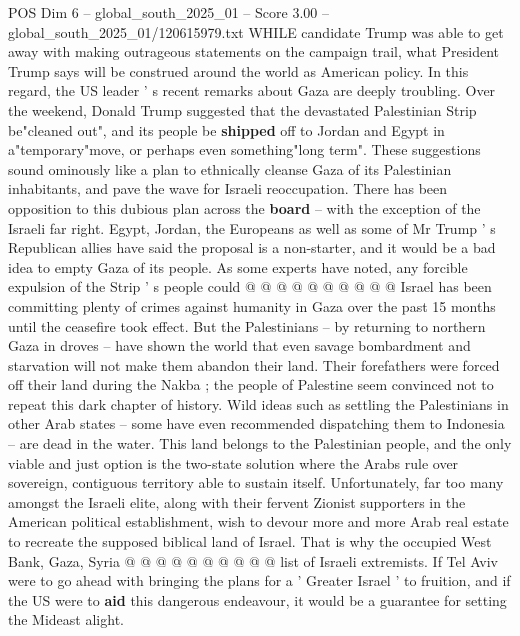 \begin{textsample}{POS Dim 6 – global\_south\_2025\_01 – Score 3.00 – global\_south\_2025\_01/120615979.txt}  \label{ex:f6_pos_360}
WHILE candidate Trump was able to get away with making outrageous statements on the campaign trail, what President Trump says will be construed around the world as American policy.
In this regard, the US leader ' s recent remarks about Gaza are deeply troubling.
Over the weekend, Donald Trump suggested that the devastated Palestinian Strip be"cleaned out", and its people be \textbf{shipped} off to Jordan and Egypt in a"temporary"move, or perhaps even something"long term".
These suggestions sound ominously like a plan to ethnically cleanse Gaza of its Palestinian inhabitants, and pave the wave for Israeli reoccupation.
There has been opposition to this dubious plan across the \textbf{board} -- with the exception of the Israeli far right.
Egypt, Jordan, the Europeans as well as some of Mr Trump ' s Republican allies have said the proposal is a non-starter, and it would be a bad idea to empty Gaza of its people.
As some experts have noted, any forcible expulsion of the Strip ' s people could @ @ @ @ @ @ @ @ @ @ Israel has been committing plenty of crimes against humanity in Gaza over the past 15 months until the ceasefire took effect.
But the Palestinians -- by returning to northern Gaza in droves -- have shown the world that even savage bombardment and starvation will not make them abandon their land.
Their forefathers were forced off their land during the Nakba ; the people of Palestine seem convinced not to repeat this dark chapter of history.
Wild ideas such as settling the Palestinians in other Arab states -- some have even recommended dispatching them to Indonesia -- are dead in the water.
This land belongs to the Palestinian people, and the only viable and just option is the two-state solution where the Arabs rule over sovereign, contiguous territory able to sustain itself.
Unfortunately, far too many amongst the Israeli elite, along with their fervent Zionist supporters in the American political establishment, wish to devour more and more Arab real estate to recreate the supposed biblical land of Israel.
That is why the occupied West Bank, Gaza, Syria @ @ @ @ @ @ @ @ @ @ list of Israeli extremists.
If Tel Aviv were to go ahead with bringing the plans for a ' Greater Israel ' to fruition, and if the US were to \textbf{aid} this dangerous endeavour, it would be a guarantee for setting the Mideast alight.

\end{textsample}
